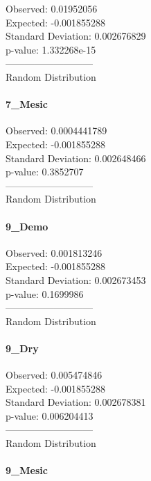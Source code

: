 \documentclass[
]{article}
\begin{document}
Observed: 0.01952056\\
Expected: -0.001855288\\
Standard Deviation: 0.002676829\\
p-value: 1.332268e-15\\
---------------------------\\
Random Distribution

\hypertarget{mesic-4}{%
\paragraph{7\_Mesic}\label{mesic-4}}

Observed: 0.0004441789\\
Expected: -0.001855288\\
Standard Deviation: 0.002648466\\
p-value: 0.3852707\\
---------------------------\\
Random Distribution

\hypertarget{demo}{%
\paragraph{9\_Demo}\label{demo}}

Observed: 0.001813246\\
Expected: -0.001855288\\
Standard Deviation: 0.002673453\\
p-value: 0.1699986\\
---------------------------\\
Random Distribution

\hypertarget{dry}{%
\paragraph{9\_Dry}\label{dry}}

Observed: 0.005474846\\
Expected: -0.001855288\\
Standard Deviation: 0.002678381\\
p-value: 0.006204413\\
---------------------------\\
Random Distribution

\hypertarget{mesic-5}{%
\paragraph{9\_Mesic}\label{mesic-5}}
\end{document}
